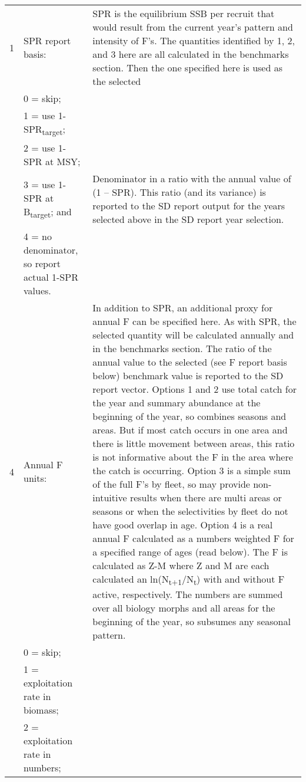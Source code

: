 {\begin{landscape}
\begin{longtable}{p{1.5cm} p{7.2cm} p{12.3cm}}
 \hline
 1 & SPR report basis: & \multirow{1}{1cm}[-0.25cm]{\parbox{12.5cm}{SPR is the equilibrium SSB per recruit that would result from the current year’s pattern and intensity of F’s.  The quantities identified by 1, 2, and 3 here are all calculated in the benchmarks section.  Then the one specified here is used as the selected }}\Tstrut\\
   & 0 = skip; & \\
   & 1 = use 1-SPR\textsubscript{target}; & \\
   & 2 = use 1-SPR at MSY; & \Tstrut\\
   & 3 = use 1-SPR at B\textsubscript{target}; and & \multirow{1}{1cm}[-0.25cm]{\parbox{12.5cm}{Denominator in a ratio with the annual value of (1 – SPR). This ratio (and its variance) is reported to the SD report output for the years selected above in the SD report year selection.}}\Tstrut\\
   & 4 = no denominator, so report actual 1-SPR values. & \\
  
 \hline 
 4 & Annual F units: &  \multirow{1}{1cm}[-0.25cm]{\parbox{12.5cm}{In addition to SPR, an additional proxy for annual F can be specified here.  As with SPR, the selected quantity will be calculated annually and in the benchmarks section.  The ratio of the annual value to the selected (see F report basis below) benchmark value is reported to the SD report vector.  Options 1 and 2 use total catch for the year and summary abundance at the beginning of the year, so combines seasons and areas.  But if most catch occurs in one area and there is little movement between areas, this ratio is not informative about the F in the area where the catch is occurring.  Option 3 is a simple sum of the full F’s by fleet, so may provide non-intuitive results when there are multi areas or seasons or when the selectivities by fleet do not have good overlap in age.  Option 4 is a real annual F calculated as a numbers weighted F for a specified range of ages (read below).  The F is calculated as Z-M where Z and M are each calculated an ln(N\textsubscript{t+1}/N\textsubscript{t}) with and without F active, respectively. The numbers are summed over all biology morphs and all areas for the beginning of the year, so subsumes any seasonal pattern.}}\Tstrut\\
   & 0 = skip; & \\
   & 1 = exploitation rate in biomass; & \\
   & 2 = exploitation rate in numbers; & \\


\end{longtable}
\end{landscape}}
